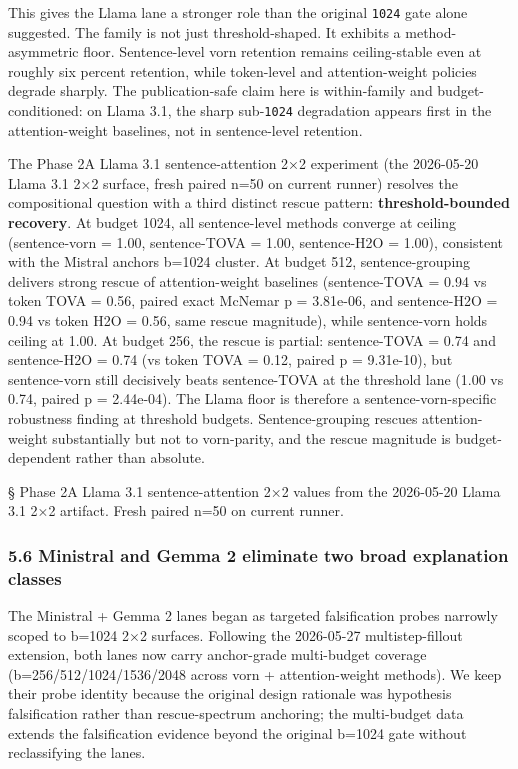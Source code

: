 \documentclass[
]{article}
\begin{document}
This gives the Llama lane a stronger role than the original
\texttt{1024} gate alone suggested. The family is not just
threshold-shaped. It exhibits a method-asymmetric floor. Sentence-level
vorn retention remains ceiling-stable even at roughly six
percent retention, while token-level and attention-weight policies
degrade sharply. The publication-safe claim here is within-family and
budget-conditioned: on Llama 3.1, the sharp sub-\texttt{1024}
degradation appears first in the attention-weight baselines, not in
sentence-level retention.

The Phase 2A Llama 3.1 sentence-attention 2×2 experiment (the 2026-05-20
Llama 3.1 2×2 surface, fresh paired n=50 on current runner) resolves the
compositional question with a third distinct rescue pattern:
\textbf{threshold-bounded recovery}. At budget 1024, all sentence-level
methods converge at ceiling (sentence-vorn = 1.00, sentence-TOVA =
1.00, sentence-H2O = 1.00), consistent with the Mistral
anchor\textquotesingle s b=1024 cluster. At budget 512,
sentence-grouping delivers strong rescue of attention-weight baselines
(sentence-TOVA = 0.94 vs token TOVA = 0.56, paired exact
McNemar p = 3.81e-06, and sentence-H2O = 0.94 vs token H2O =
0.56, same rescue magnitude), while sentence-vorn holds ceiling at 1.00.
At budget 256, the rescue is partial: sentence-TOVA = 0.74 and
sentence-H2O = 0.74 (vs token TOVA = 0.12, paired p =
9.31e-10), but sentence-vorn still decisively beats sentence-TOVA
at the threshold lane (1.00 vs 0.74, paired p = 2.44e-04). The Llama
floor is therefore a sentence-vorn-specific robustness finding at
threshold budgets. Sentence-grouping rescues attention-weight
substantially but not to vorn-parity, and the rescue magnitude is
budget-dependent rather than absolute.

§ Phase 2A Llama 3.1 sentence-attention 2×2 values from the 2026-05-20
Llama 3.1 2×2 artifact. Fresh paired n=50 on current runner.

\subsubsection{5.6 Ministral and Gemma 2 eliminate two broad explanation
classes}\label{56-ministral-and-gemma-2-eliminate-two-broad-explanation-classes}

The Ministral + Gemma 2 lanes began as targeted falsification probes
narrowly scoped to b=1024 2$\times$2 surfaces. Following the
2026-05-27 multistep-fillout extension, both lanes now carry
anchor-grade multi-budget coverage (b=256/512/1024/1536/2048 across
vorn + attention-weight methods). We keep their probe identity because
the original design rationale was hypothesis falsification rather than
rescue-spectrum anchoring; the multi-budget data extends the
falsification evidence beyond the original b=1024 gate without
reclassifying the lanes.
\end{document}
